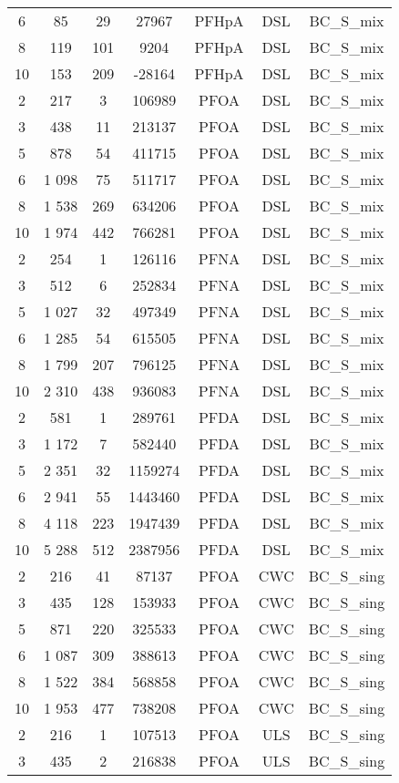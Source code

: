 \begin{longtable}[c]{ccccccc}
6 & 85 & 29 & 27967 & PFHpA & DSL & BC\_S\_mix \\
8 & 119 & 101 & 9204 & PFHpA & DSL & BC\_S\_mix \\
10 & 153 & 209 & -28164 & PFHpA & DSL & BC\_S\_mix \\
2 & 217 & 3 & 106989 & PFOA & DSL & BC\_S\_mix \\
3 & 438 & 11 & 213137 & PFOA & DSL & BC\_S\_mix \\
5 & 878 & 54 & 411715 & PFOA & DSL & BC\_S\_mix \\
6 & 1 098 & 75 & 511717 & PFOA & DSL & BC\_S\_mix \\
8 & 1 538 & 269 & 634206 & PFOA & DSL & BC\_S\_mix \\
10 & 1 974 & 442 & 766281 & PFOA & DSL & BC\_S\_mix \\
2 & 254 & 1 & 126116 & PFNA & DSL & BC\_S\_mix \\
3 & 512 & 6 & 252834 & PFNA & DSL & BC\_S\_mix \\
5 & 1 027 & 32 & 497349 & PFNA & DSL & BC\_S\_mix \\
6 & 1 285 & 54 & 615505 & PFNA & DSL & BC\_S\_mix \\
8 & 1 799 & 207 & 796125 & PFNA & DSL & BC\_S\_mix \\
10 & 2 310 & 438 & 936083 & PFNA & DSL & BC\_S\_mix \\
2 & 581 & 1 & 289761 & PFDA & DSL & BC\_S\_mix \\
3 & 1 172 & 7 & 582440 & PFDA & DSL & BC\_S\_mix \\
5 & 2 351 & 32 & 1159274 & PFDA & DSL & BC\_S\_mix \\
6 & 2 941 & 55 & 1443460 & PFDA & DSL & BC\_S\_mix \\
8 & 4 118 & 223 & 1947439 & PFDA & DSL & BC\_S\_mix \\
10 & 5 288 & 512 & 2387956 & PFDA & DSL & BC\_S\_mix \\
2 & 216 & 41 & 87137 & PFOA & CWC & BC\_S\_sing \\
3 & 435 & 128 & 153933 & PFOA & CWC & BC\_S\_sing \\
5 & 871 & 220 & 325533 & PFOA & CWC & BC\_S\_sing \\
6 & 1 087 & 309 & 388613 & PFOA & CWC & BC\_S\_sing \\
8 & 1 522 & 384 & 568858 & PFOA & CWC & BC\_S\_sing \\
10 & 1 953 & 477 & 738208 & PFOA & CWC & BC\_S\_sing \\
2 & 216 & 1 & 107513 & PFOA & ULS & BC\_S\_sing \\
3 & 435 & 2 & 216838 & PFOA & ULS & BC\_S\_sing \\

\end{longtable}
